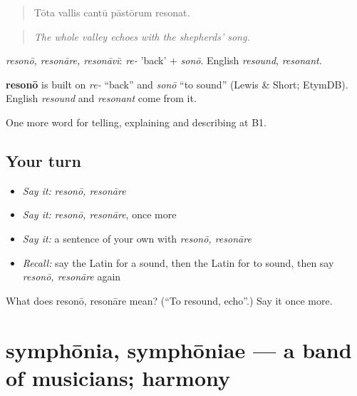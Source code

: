\begin{quote}
Tōta vallis cantū pāstōrum resonat.
\end{quote}

\begin{quote}
\emph{The whole valley echoes with the shepherds' song.}
\end{quote}

\emph{resonō, resonāre, resonāvī}: \emph{re-} 'back' + \emph{sonō}. English \emph{resound}, \emph{resonant}.

\begin{cousinweb}
\textbf{resonō} is built on \emph{re-} \textquotedblleft{}back\textquotedblright{} and \emph{sonō} \textquotedblleft{}to sound\textquotedblright{} (Lewis \& Short; EtymDB). English \emph{resound} and \emph{resonant} come from it.
\end{cousinweb}

\begin{grammarlens}[title={What you've built}]
One more word for telling, explaining and describing at B1.
\end{grammarlens}

\subsection*{Your turn}
\begin{itemize}
\raggedright
  \item \emph{Say it:} \emph{resonō, resonāre}
  \item \emph{Say it:} \emph{resonō, resonāre}, once more
  \item \emph{Say it:} a sentence of your own with \emph{resonō, resonāre}
  \item \emph{Recall:} say the Latin for a sound, then the Latin for to sound, then say \emph{resonō, resonāre} again
\end{itemize}

\begin{tcolorbox}[breakable,colback=teal!4,colframe=teal!35!black,title={Before you move on}]
What does resonō, resonāre mean? (\textquotedblleft{}To resound, echo\textquotedblright{}.) Say it once more.
\end{tcolorbox}
\section[symphōnia, symphōniae]{symphōnia, symphōniae — a band of musicians; harmony}

\label{lesson:LA-C545-symphonia}



